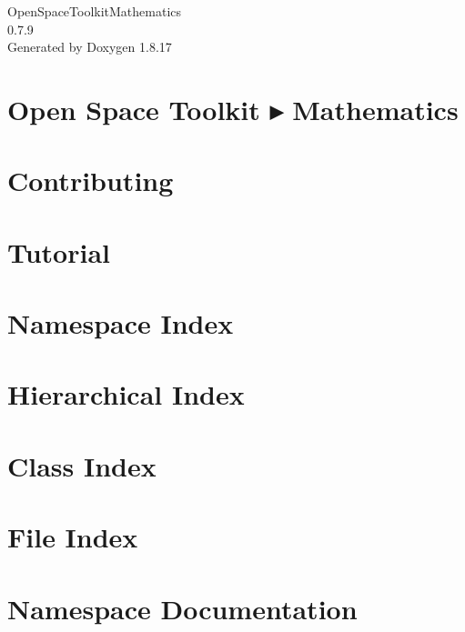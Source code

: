 \let\mypdfximage\pdfximage\def\pdfximage{\immediate\mypdfximage}\documentclass[twoside]{book}
\newcommand{\+}{\discretionary{\mbox{\scriptsize$\hookleftarrow$}}{}{}}
\newcommand{\clearemptydoublepage}{%
  \newpage{\pagestyle{empty}\cleardoublepage}%
}
\begin{document}
\hypersetup{pageanchor=false,
             bookmarksnumbered=true,
             pdfencoding=unicode
            }
\begin{titlepage}
\vspace*{7cm}
\begin{center}%
{\Large Open\+Space\+Toolkit\+Mathematics \\[1ex]\large 0.\+7.\+9 }\\
\vspace*{1cm}
{\large Generated by Doxygen 1.8.17}\\
\end{center}
\end{titlepage}
\clearemptydoublepage
{}
\tableofcontents
\clearemptydoublepage
{}
\hypersetup{pageanchor=true}

\chapter{Open Space Toolkit ▸ Mathematics}
\label{index}\hypertarget{index}{}
\chapter{Contributing}
\label{md__c_o_n_t_r_i_b_u_t_i_n_g}

\chapter{Tutorial}
\label{md_docs__tutorial}

\chapter{Namespace Index}

\chapter{Hierarchical Index}

\chapter{Class Index}

\chapter{File Index}

\chapter{Namespace Documentation}













\end{document}
